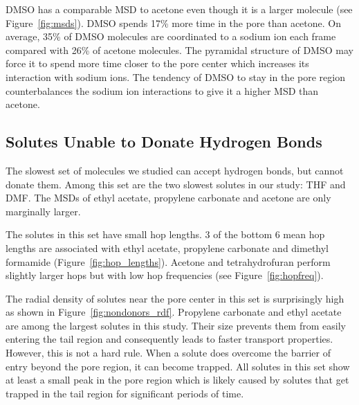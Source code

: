 \documentclass[journal=jpcbfk,manuscript=article]{achemso}
\begin{document}
  DMSO has a comparable MSD to acetone even though it is a larger molecule
  (see Figure~\ref{fig:msds}). DMSO spends 17\% more time in the pore than acetone. 
  On average, 35\% of DMSO molecules are coordinated to a sodium ion each
  frame compared with 26\% of acetone molecules. The pyramidal structure 
  of DMSO may force it to spend more time closer to the pore center which
  increases its interaction with sodium ions. The tendency of DMSO to stay
  in the pore region counterbalances the sodium ion interactions to give it
  a higher MSD than acetone. 
  
  \subsection{Solutes Unable to Donate Hydrogen Bonds}  %

  The slowest set of molecules we studied can accept hydrogen bonds, but
  cannot donate them. Among this set are the two slowest solutes in our study: 
  THF and DMF. The MSDs of ethyl acetate, propylene carbonate and acetone are
  only marginally larger.
  
  The solutes in this set have small hop lengths. 3 of the bottom 6 mean hop
  lengths are associated with ethyl acetate, propylene carbonate and
  dimethyl formamide (Figure~\ref{fig:hop_lengths}). Acetone and 
  tetrahydrofuran perform slightly larger hops but with low hop frequencies
  (see Figure~\ref{fig:hopfreq}).
  
  The radial density of solutes near the pore center in this set is 
  surprisingly high as shown in Figure~\ref{fig:nondonors_rdf}. Propylene
  carbonate and ethyl acetate are among the largest solutes in this study. 
  Their size prevents them from easily entering the tail region and 
  consequently leads to faster transport properties.  %
  However, this is not a hard rule. When a solute does overcome the 
  barrier of entry beyond the pore region, it can become trapped. All
  solutes in this set show at least a small peak in the pore region which
  is 
likely caused by solutes that get trapped in the tail region for 
  significant periods of time.
    
\end{document}
